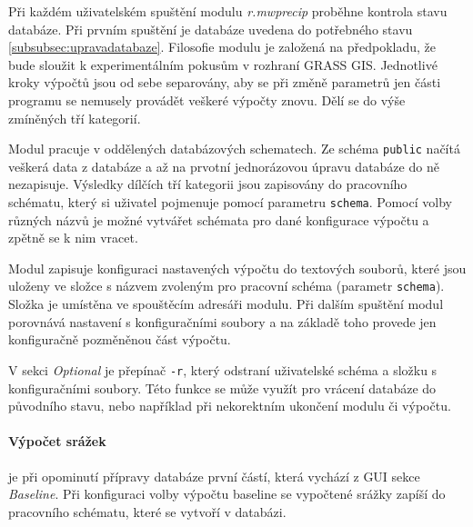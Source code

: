 \documentclass[a4paper,12pt,oneside]{report}
\begin{document}
Při každém uživatelském spuštění modulu \textit{r.mwprecip } proběhne kontrola stavu databáze. Při prvním spuštění je databáze uvedena do potřebného stavu \ref{subsubsec:upravadatabaze}. Filosofie modulu je založená na předpokladu, že bude sloužit k experimentálním pokusům v rozhraní GRASS GIS. Jednotlivé kroky výpočtů jsou od sebe separovány, aby se při změně parametrů jen části programu se nemusely provádět veškeré výpočty znovu. Dělí se do výše zmíněných tří kategorií. 

Modul pracuje v oddělených databázových schematech. Ze schéma \texttt{public} načítá veškerá data z databáze a až na prvotní jednorázovou úpravu databáze do ně nezapisuje. Výsledky dílčích tří kategorii jsou zapisovány do pracovního schématu, který si uživatel pojmenuje pomocí parametru \texttt{schema}. Pomocí volby různých názvů je možné vytvářet schémata pro dané konfigurace výpočtu a zpětně se k nim vracet.

Modul zapisuje konfiguraci nastavených výpočtu do textových souborů, které jsou uloženy ve složce s názvem zvoleným pro pracovní schéma (parametr \texttt{schema}). Složka je umístěna ve spouštěcím adresáři modulu. Při dalším spuštění modul porovnává nastavení s konfiguračními soubory a na základě toho provede jen konfiguračně pozměněnou část výpočtu. 

V sekci \textit{Optional} je přepínač \texttt{-r}, který odstraní uživatelské schéma a složku s konfiguračními soubory. Této funkce se může využít pro vrácení databáze do původního stavu, nebo například při nekorektním ukončení modulu či výpočtu.


\paragraph*{Výpočet srážek} je při opominutí přípravy databáze první částí, která vychází z \acs{GUI} sekce \textit{Baseline}. Při konfiguraci volby výpočtu baseline se vypočtené srážky zapíší do pracovního schématu, které se vytvoří v databázi.
\end{document}
